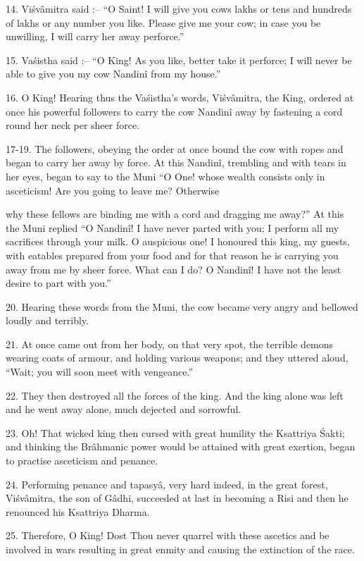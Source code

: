 14. Vi\'sv\^amitra said :-- ``O Saint! I will give you cows lakhs or tens and hundreds of lakhs or any number you like. Please give me your cow; in case you be unwilling, I will carry her away perforce.''

15. Va\'sistha said :-- ``O King! As you like, better take it perforce; I will never be able to give you my cow Nandin\^i from my house.''

16. O King! Hearing thus the Va\'sistha's words, Vi\'sv\^amitra, the King, ordered at once his powerful followers to carry the cow Nandin\^i away by fastening a cord round her neck per sheer force.

17-19. The followers, obeying the order at once bound the cow with ropes and began to carry her away by force. At this Nandin\^i, trembling and with tears in her eyes, began to say to the Muni ``O One! whose wealth consists only in asceticism! Are you going to leave me? Otherwise

why these fellows are binding me with a cord and dragging me away?'' At this the Muni replied ``O Nandin\^i! I have never parted with you; I perform all my sacrifices through your milk. O auspicious one! I honoured this king, my guests, with eatables prepared from your food and for that reason he is carrying you away from me by sheer force. What can I do? O Nandin\^i! I have not the least desire to part with you.''

20. Hearing these words from the Muni, the cow became very angry and bellowed loudly and terribly.

21. At once came out from her body, on that very spot, the terrible demons wearing coats of armour, and holding various weapons; and they uttered aloud, ``Wait; you will soon meet with vengeance.''

22. They then destroyed all the forces of the king. And the king alone was left and he went away alone, much dejected and sorrowful.

23. Oh! That wicked king then cursed with great humility the Ksattriya \'Sakti; and thinking the Br\^ahmanic power would be attained with great exertion, began to practise asceticism and penance.

24. Performing penance and tapasy\^a, very hard indeed, in the great forest, Vi\'sv\^amitra, the son of G\^adhi, succeeded at last in becoming a Risi and then he renounced his Ksattriya Dharma.

25. Therefore, O King! Dost Thou never quarrel with these ascetics and be involved in wars resulting in great enmity and causing the extinction of the race.

